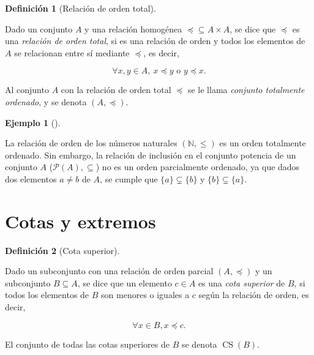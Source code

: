 \documentclass[
  a4paper,
]{scrreport}
\theoremstyle{plain}
\theoremstyle{plain}
\theoremstyle{definition}
\newtheorem{definition}{Definición}[chapter]
\theoremstyle{definition}
\newtheorem{example}{Ejemplo}[chapter]
\theoremstyle{plain}
\theoremstyle{remark}
\begin{document}
\begin{definition}[Relación de orden
total]\protect\hypertarget{def-relacion-orden-total}{}\label{def-relacion-orden-total}

Dado un conjunto \(A\) y una relación homogénea
\(\preceq \subseteq A \times A\), se dice que \(\preceq\) es una
\emph{relación de orden total}, si es una relación de orden y todos los
elementos de \(A\) se relacionan entre sí mediante \(\preceq\), es
decir,

\[\forall x, y\in A,\ x\preceq y \mbox{ o } y \preceq x.\]

Al conjunto \(A\) con la relación de orden total \(\preceq\) se le llama
\emph{conjunto totalmente ordenado}, y se denota \((A,\preceq)\).

\end{definition}

\begin{example}[]\protect\hypertarget{exm-relacion-orden-total}{}\label{exm-relacion-orden-total}

La relación de orden de los números naturales \((\mathbb{N},\leq)\) es
un orden totalmente ordenado. Sin embargo, la relación de inclusión en
el conjunto potencia de un conjunto \(A\) (\(\mathcal{P}(A),\subseteq\))
no es un orden parcialmente ordenado, ya que dados dos elementos
\(a\neq b\) de \(A\), se cumple que \(\{a\}\subsetneq \{b\}\) y
\(\{b\}\subsetneq \{a\}\).

\end{example}

\hypertarget{cotas-y-extremos}{%
\section{Cotas y extremos}\label{cotas-y-extremos}}

\begin{definition}[Cota
superior]\protect\hypertarget{def-cota-superior-conjunto}{}\label{def-cota-superior-conjunto}

Dado un subconjunto con una relación de orden parcial \((A,\preceq)\) y
un subconjunto \(B\subseteq A\), se dice que un elemento \(c\in A\) es
una \emph{cota superior} de \(B\), si todos los elementos de \(B\) son
menores o iguales a \(c\) según la relación de orden, es decir,

\[\forall x \in B, x\preceq c.\]

El conjunto de todas las cotas superiores de \(B\) se denota
\(\operatorname{CS}(B)\).

\end{definition}
\end{document}

